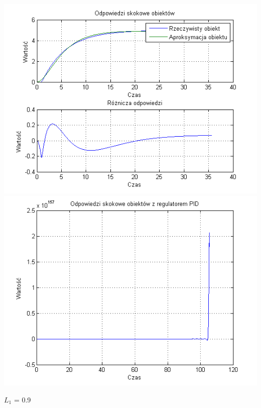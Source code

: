 \documentclass[10pt,a4paper]{article}
\begin{document}
\begin{center}
\includegraphics[scale=1]{images/dwa/skrypt_203.png}\\
\includegraphics[scale=1]{images/dwa/skrypt_204.png}\\
\end{center}
\newpage
$L_1$ = 0.9
\end{document}
